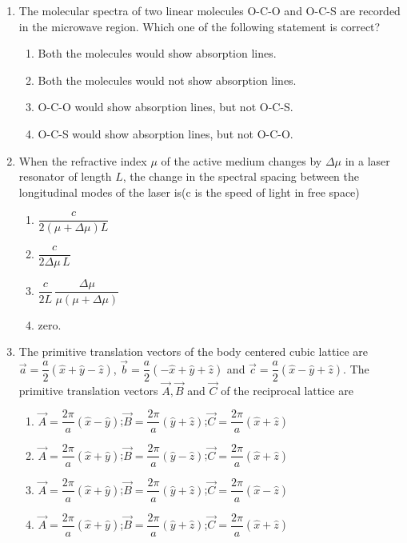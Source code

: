\documentclass[journal,12pt,onecolumn]{IEEEtran}
\theoremstyle{remark}
\begin{document}
\begin{enumerate}
\item The molecular spectra of two linear molecules O-C-O and O-C-S are recorded in the microwave region. Which one of the following statement is correct?
\hfill{}
\begin{multicols}{2}
\begin{enumerate}
    \item Both the molecules would show absorption lines.
    \item Both the molecules would not show absorption lines.
    \item O-C-O would show absorption lines, but not O-C-S.
    \item O-C-S would show absorption lines, but not O-C-O.
\end{enumerate}
\end{multicols}

\item When the refractive index $\mu$ of the active medium changes by $\Delta\mu$ in a laser resonator of length $L$, the change in the spectral spacing between the longitudinal modes of the laser is(c is the speed of light in free space)
\hfill{}
\begin{multicols}{4}
\begin{enumerate}
    \item $\dfrac{c}{2(\mu+\Delta\mu)L}$
    \item $\dfrac{c}{2\Delta\mu\,L}$
    \item $\dfrac{c}{2L}\,\dfrac{\Delta\mu}{\mu(\mu+\Delta\mu)}$
    \item zero.
\end{enumerate}
\end{multicols}

\item The primitive translation vectors of the body centered cubic lattice are $\vec{a}=\dfrac{a}{2}(\hat{x}+\hat{y}-\hat{z})$, $\vec{b}=\dfrac{a}{2}(-\hat{x}+\hat{y}+\hat{z})$ and $\vec{c}=\dfrac{a}{2}(\hat{x}-\hat{y}+\hat{z})$. The primitive translation vectors $\vec{A},\vec{B}$ and $\vec{C}$ of the reciprocal lattice are
\hfill{}
\begin{enumerate}
    \item $\vec{A}=\dfrac{2\pi}{a}(\hat{x}-\hat{y})$;\quad $\vec{B}=\dfrac{2\pi}{a}(\hat{y}+\hat{z})$;\quad $\vec{C}=\dfrac{2\pi}{a}(\hat{x}+\hat{z})$
    \item $\vec{A}=\dfrac{2\pi}{a}(\hat{x}+\hat{y})$;\quad $\vec{B}=\dfrac{2\pi}{a}(\hat{y}-\hat{z})$;\quad $\vec{C}=\dfrac{2\pi}{a}(\hat{x}+\hat{z})$
    \item $\Vec{A}=\dfrac{2\pi}{a}(\hat{x}+\hat{y})$;\quad $\vec{B}=\dfrac{2\pi}{a}(\hat{y}+\hat{z})$;\quad $\vec{C}=\dfrac{2\pi}{a}(\hat{x}-\hat{z})$
    \item $\vec{A}=\dfrac{2\pi}{a}(\hat{x}+\hat{y})$;\quad $\vec{B}=\dfrac{2\pi}{a}(\hat{y}+\hat{z})$;\quad $\vec{C}=\dfrac{2\pi}{a}(\hat{x}+\hat{z})$
\end{enumerate}


\end{enumerate}
\end{document}
